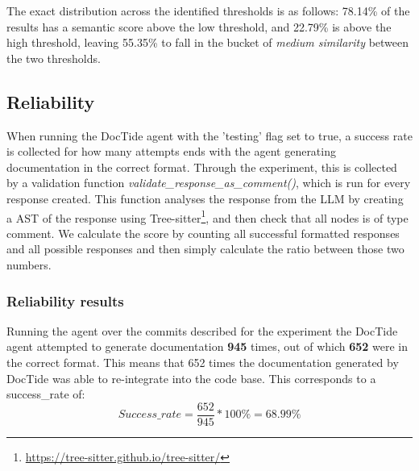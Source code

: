 \noindent
The exact distribution across the identified thresholds is as follows: 78.14\% of the results has a semantic score above the low threshold, and 22.79\% is above the high threshold, leaving 55.35\% to fall in the bucket of \textit{medium similarity} between the two thresholds.

\subsection{Reliability}
When running the DocTide agent with the 'testing' flag set to true, a success rate is collected for how many attempts ends with the agent generating documentation in the correct format.
Through the experiment, this is collected by a validation function \textit{validate\_response\_as\_comment()}, which is run for every response created. This function analyses the response from the LLM by creating a AST of the response using Tree-sitter\footnote{\url{https://tree-sitter.github.io/tree-sitter/}}, and then check that all nodes is of type comment.
We calculate the score by counting all successful formatted responses and all possible responses and then simply calculate the ratio between those two numbers.
\subsubsection{Reliability results}
\label{sec:suc_results}
Running the agent over the commits described for the experiment the DocTide agent attempted to generate documentation \textbf{945} times, out of which \textbf{652} were in the correct format. This means that 652 times the documentation generated by DocTide was able to re-integrate into the code base. This corresponds to a success\_rate of:
\[
Success\_rate=\frac{652}{945}*100\% = 68.99\%
\]

